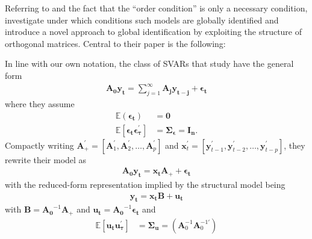\documentclass[a4paper,11pt,listof=nochaptergap,oneside,pointednumbers,bibtotoc,bigheadings,liststotoc,hidelinks]{scrbook}
\theoremstyle{mysatz}
\theoremstyle{mydefinition}
\theoremstyle{mytheorem}
\theoremstyle{mybemerkung}
\newcommand{\vect}[1]{\boldsymbol{\mathbf{#1}}}
\begin{document}
Referring to \citet{rothenberg:71} and the fact that the ``order condition'' is only a necessary condition, \citet{rubioetal:10} investigate under which conditions such models are globally identified and introduce a novel approach to global identification by exploiting the structure of orthogonal matrices. Central to their paper is the following: 

In line with our own notation, the class of SVARs that \citet{rubioetal:10} study have the general form
\begin{equation} \label{eq:svar_1}
\begin{split}
	\vect{A_0} \vect{y_t} = \sum\limits_{j=1}^\infty \vect{A_j}\vect{y_{t-j}} + \vect{\epsilon_t}
\end{split}								
\end{equation}
where they assume 
\begin{equation}\label{eq:svar_2}
\begin{split}
	\mathbb{E}(\vect{\epsilon_t}) &  = \vect{0}  \\
	\mathbb{E}[\vect{\epsilon_t}\vect{\epsilon_{\tau}^'}] & = \vect{\Sigma_\epsilon} = \vect{I_n}.
\end{split}								
\end{equation}
Compactly writing $\vect{A}_{+}^' = [\vect{A}_1^', \vect{A}_2^', \dots, \vect{A}_p^']$ and $\vect{x}_{t}^' = [\vect{y}_{t-1}^', \vect{y}_{t-2}^', \dots, \vect{y}_{t-p}^']$, they rewrite their model as
\begin{equation}\label{eq:svar_3}
\begin{split}
	\vect{A_0} \vect{y_t} =  \vect{x_t} \vect{A}_+ + \vect{\epsilon_t}
\end{split}								
\end{equation}
with the reduced-form representation implied by the structural model being
\begin{equation}\label{eq:svar_4}
\begin{split}
	 \vect{y_t} =  \vect{x_t} \vect{B} + \vect{u_t}
\end{split}								
\end{equation}
with $\vect{B} = \vect{A_0}^{-1}\vect{A}_+$ and $\vect{u_t} = \vect{A_0}^{-1}\vect{\epsilon_t}$ and
	\begin{equation} \label{eq:svar_5}
	\begin{split}
		\mathbb{E}[\vect{u_t}\vect{u_{\tau}^'}] & = 
      		\vect{\Sigma_u} = (\vect{A}_0^{-1}\vect{A}_0^{-1'})
	\end{split}								
	\end{equation}	
\end{document}
